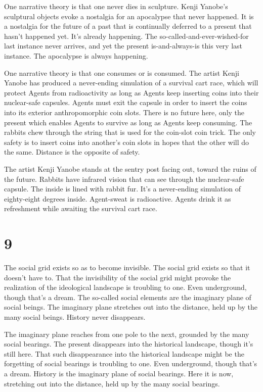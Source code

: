 \documentclass[
]{memoir}
\begin{document}
One narrative theory is that one never dies in sculpture. Kenji Yanobe's
sculptural objects evoke a nostalgia for an apocalypse that never
happened. It is a nostalgia for the future of a past that is continually
deferred to a present that hasn't happened yet. It's already happening.
The so-called-and-ever-wished-for last instance never arrives, and yet
the present is-and-always-is this very last instance. The apocalypse is
always happening.

One narrative theory is that one consumes or is consumed. The artist
Kenji Yanobe has produced a never-ending simulation of a survival cart
race, which will protect Agents from radioactivity as long as Agents
keep inserting coins into their nuclear-safe capsules. Agents must exit
the capsule in order to insert the coins into its exterior
anthropomorphic coin slots. There is no future here, only the present
which enables Agents to survive as long as Agents keep consuming. The
rabbits chew through the string that is used for the coin-slot coin
trick. The only safety is to insert coins into another's coin slots in
hopes that the other will do the same. Distance is the opposite of
safety.

The artist Kenji Yanobe stands at the sentry post facing out, toward the
ruins of the future. Rabbits have infrared vision that can see through
the nuclear-safe capsule. The inside is lined with rabbit fur. It's a
never-ending simulation of eighty-eight degrees inside. Agent-sweat is
radioactive. Agents drink it as refreshment while awaiting the survival
cart race.

\hypertarget{section-10}{%
\section*{9}\label{section-10}}

The social grid exists so as to become invisible. The social grid exists
so that it doesn't have to. That the invisibility of the social grid
might provoke the realization of the ideological landscape is troubling
to one. Even underground, though that's a dream. The so-called social
elements are the imaginary plane of social beings. The imaginary plane
stretches out into the distance, held up by the many social beings.
History never disappears.

The imaginary plane reaches from one pole to the next, grounded by the
many social bearings. The present disappears into the historical
landscape, though it's still here. That such disappearance into the
historical landscape might be the forgetting of social bearings is
troubling to one. Even underground, though that's a dream. History is
the imaginary plane of social bearings. Here it is now, stretching out
into the distance, held up by the many social bearings.
\end{document}
